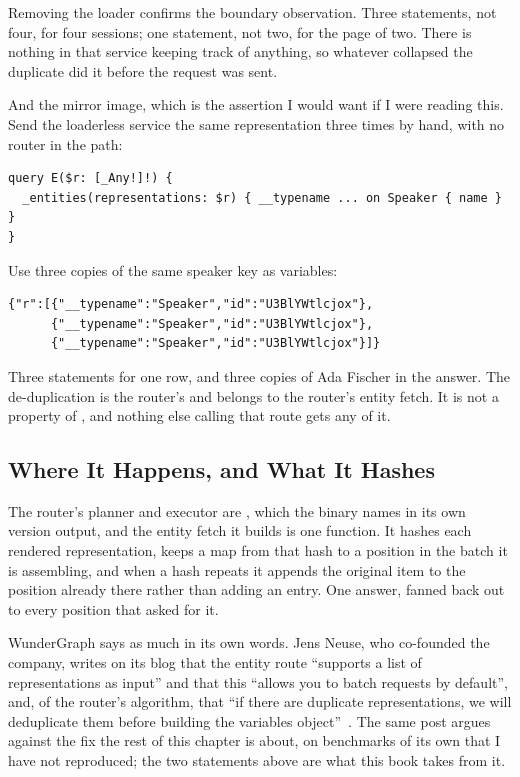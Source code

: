 %
Removing the loader confirms the boundary observation. Three statements, not four, for
four sessions; one statement, not two, for the page of two. There is nothing in
that service keeping track of anything, so whatever collapsed the duplicate
did it before the request was sent.

%
And the mirror image, which is the assertion I would want if I were reading
this. Send the loaderless service the same representation three times by hand,
with no router in the path:

\begin{verbatim}
query E($r: [_Any!]!) {
  _entities(representations: $r) { __typename ... on Speaker { name } }
}
\end{verbatim}

Use three copies of the same speaker key as variables:

\begin{verbatim}
{"r":[{"__typename":"Speaker","id":"U3BlYWtlcjox"},
      {"__typename":"Speaker","id":"U3BlYWtlcjox"},
      {"__typename":"Speaker","id":"U3BlYWtlcjox"}]}
\end{verbatim}

%
Three statements for one row, and three copies of Ada Fischer in the answer.
The de-duplication is the router's and belongs to the router's entity fetch.
It is not a property of , and nothing else calling that route
gets any of it.

\subsection{Where It Happens, and What It Hashes}

%
The router's planner and executor are , which the binary
names in its own version output, and the entity fetch it builds is one function.
It hashes each rendered representation, keeps a map from that hash to a position
in the batch it is assembling, and when a hash repeats it appends the original
item to the position already there rather than adding an entry. One answer,
fanned back out to every position that asked for it.

%
WunderGraph says as much in its own words. Jens Neuse, who co-founded the
company, writes on its blog that the entity route
\enquote{supports a list of representations as input} and that this
\enquote{allows you to batch requests by default}, and, of the router's
algorithm, that \enquote{if there are duplicate representations, we will
deduplicate them before building the variables
object}~\autocite{neuse2023dataloader}. The same post argues against the fix the
rest of this chapter is about, on benchmarks of its own that I have not
reproduced; the two statements above are what this book takes from it.


